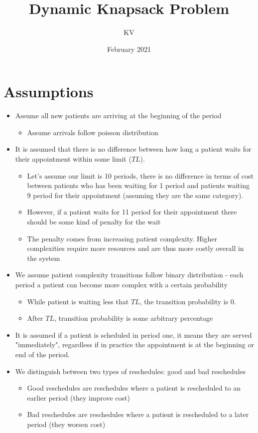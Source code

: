 \documentclass{article}
\title{Dynamic Knapsack Problem}
\author{KV}
\date{February 2021}
\begin{document}
\maketitle

\section{Assumptions} 
\begin{itemize}
	\item Assume all new patients are arriving at the beginning of the period 
	\begin{itemize}
		\item Assume arrivals follow poisson distribution
	\end{itemize}		
	
	\item It is assumed that there is no difference between how long a patient waits for their appointment within some limit ($TL$). 
	\begin{itemize}
		\item Let's assume our limit is 10 periods, there is no difference in terms of cost between patients who has been waiting for 1 period and patients waiting 9 period for their appointment (assuming they are the same category).  
		\item However, if a patient waits for 11 period for their appointment there should be some kind of penalty for the wait
		\item The penalty comes from increasing patient complexity. Higher complexities require more resources and are thus more costly overall in the system
	\end{itemize}		
	
	\item We assume patient complexity transitions follow binary distribution - each period a patient can become more complex with a certain probability
		\begin{itemize}
			\item While patient is waiting less that $TL$, the transition probability is 0.
			\item After $TL$, transition probability is some arbitrary percentage
		\end{itemize}
	
	\item It is assumed if a patient is scheduled in period one, it means they are served "immediately", regardless if in practice the appointment is at the beginning or end of the period.
	\item We distinguish between two types of reschedules: good and bad reschedules
	\begin{itemize}
		\item Good reschedules are reschedules where a patient is rescheduled to an earlier period (they improve cost)
		\item Bad reschedules are reschedules where a patient is rescheduled to a later period (they worsen cost)
	\end{itemize}


\end{itemize}
\end{document}
